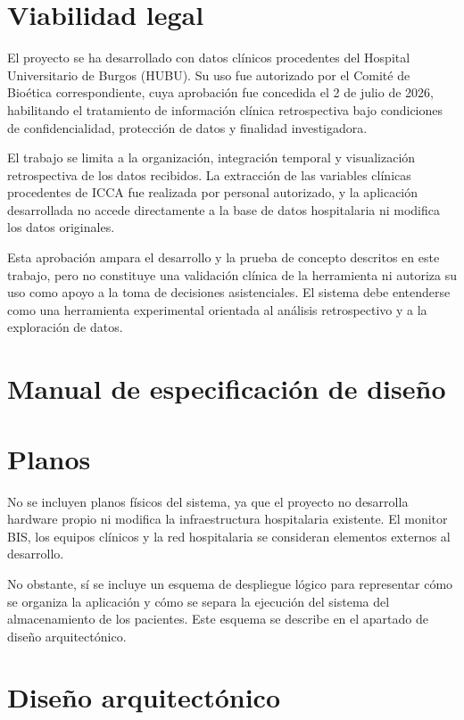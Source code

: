 \documentclass[
  spanish,
  a4paper,
  12pt,
  twoside]{memoir}
\newcommand{\apendice}[1]{\chapter{#1}}
\begin{document}
\chapter{Viabilidad legal}\label{viabilidad-legal}

El proyecto se ha desarrollado con datos clínicos procedentes del
Hospital Universitario de Burgos (HUBU). Su uso fue autorizado por el
Comité de Bioética correspondiente, cuya aprobación fue concedida el 2
de julio de 2026, habilitando el tratamiento de información clínica
retrospectiva bajo condiciones de confidencialidad, protección de datos
y finalidad investigadora.

El trabajo se limita a la organización, integración temporal y
visualización retrospectiva de los datos recibidos. La extracción de las
variables clínicas procedentes de ICCA fue realizada por personal
autorizado, y la aplicación desarrollada no accede directamente a la
base de datos hospitalaria ni modifica los datos originales.

Esta aprobación ampara el desarrollo y la prueba de concepto descritos
en este trabajo, pero no constituye una validación clínica de la
herramienta ni autoriza su uso como apoyo a la toma de decisiones
asistenciales. El sistema debe entenderse como una herramienta
experimental orientada al análisis retrospectivo y a la exploración de
datos.


\apendice{Manual de especificación de diseño}

\chapter{Planos}\label{planos}

No se incluyen planos físicos del sistema, ya que el proyecto no
desarrolla hardware propio ni modifica la infraestructura hospitalaria
existente. El monitor BIS, los equipos clínicos y la red hospitalaria se
consideran elementos externos al desarrollo.

No obstante, sí se incluye un esquema de despliegue lógico para
representar cómo se organiza la aplicación y cómo se separa la ejecución
del sistema del almacenamiento de los pacientes. Este esquema se
describe en el apartado de diseño arquitectónico.

\chapter{Diseño arquitectónico}\label{diseuxf1o-arquitectuxf3nico}
\end{document}
